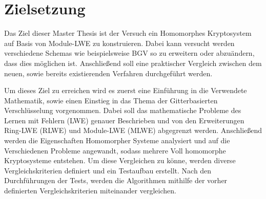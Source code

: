 \chapter{Zielsetzung}
\label{Zielsetzung}

Das Ziel dieser Master Thesis ist der Versuch ein Homomorphes Kryptosystem auf Basis von Module-LWE zu konstruieren. Dabei kann versucht werden verschiedene Schemas wie beispielsweise BGV \cite{BGV} so zu erweitern oder abzuändern, dass dies möglichen ist. Anschließend soll eine praktischer Vergleich zwischen dem neuen, sowie bereits existierenden Verfahren durchgeführt werden.

Um dieses Ziel zu erreichen wird es zuerst eine Einführung in die Verwendete Mathematik, sowie einen Einstieg in das Thema der Gitterbasierten Verschlüsselung vorgenommen. Dabei soll das mathematische Probleme des \glqq Lernen mit Fehlern (LWE)\grqq{} genauer Beschrieben und von den Erweiterungen Ring-LWE (RLWE) und Module-LWE (MLWE) abgegrenzt werden. Anschließend werden die Eigenschaften Homomorpher Systeme analysiert und auf die Verschiedenen Probleme angewandt, sodass mehrere Voll homomorphe Kryptosysteme entstehen. Um diese Vergleichen zu könne, werden diverse Vergleichskriterien definiert und ein Testaufbau erstellt. Nach den Durchführungen der Tests, werden die Algorithmen mithilfe der vorher definierten Vergleichskriterien miteinander vergleichen.
